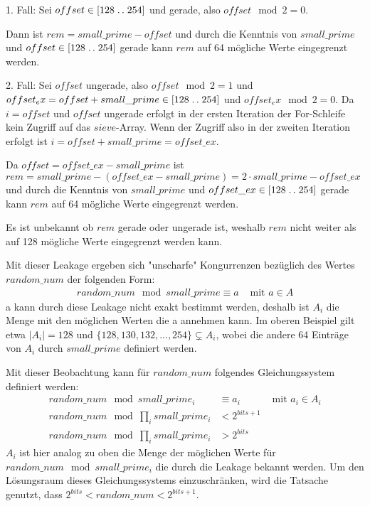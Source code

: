 1. Fall: Sei $offset \in [128\mathrel{{.}\,{.}}\nobreak254]$ und gerade, also $offset \mod 2 = 0$. 

Dann ist $rem = small\_prime - offset$ und durch die Kenntnis von $small\_prime$ und $offset \in [128\mathrel{{.}\,{.}}\nobreak254]$ gerade kann $rem$ auf 64 mögliche Werte eingegrenzt werden.

2. Fall: Sei $offset$ ungerade, also $offset \mod 2 = 1$ und $offset_ex = offset + small\_prime \in [128\mathrel{{.}\,{.}}\nobreak254]$ und $offset_ex \mod 2 = 0$. Da $i=offset$ und $offset$ ungerade erfolgt in der ersten Iteration der For-Schleife kein Zugriff auf das $sieve$-Array. Wenn der Zugriff also in der zweiten Iteration erfolgt ist $i = offset + small\_prime = offset\_ex$.

Da $offset = offset\_ex - small\_prime$ ist $rem = small\_prime - (offset\_ex - small\_prime) = 2 \cdot small\_prime - offset\_ex$ und durch die Kenntnis von $small\_prime$ und $offset\_ex \in [128\mathrel{{.}\,{.}}\nobreak254]$ gerade kann $rem$ auf 64 mögliche Werte eingegrenzt werden.

Es ist unbekannt ob $rem$ gerade oder ungerade ist, weshalb $rem$ nicht weiter als auf 128 mögliche Werte eingegrenzt werden kann.

Mit dieser Leakage ergeben sich "unscharfe" Kongurrenzen bezüglich des Wertes $random\_num$ der folgenden Form:
\begin{align}
    random\_num \mod small\_prime \equiv a &\text{ mit } a \in A
\end{align}
a kann durch diese Leakage nicht exakt bestimmt werden, deshalb ist $A_i$ die Menge mit den möglichen Werten die a annehmen kann.
Im oberen Beispiel gilt etwa $|A_i| = 128$ und $\{128,130,132,...,254\} \subsetneq A_i$, wobei die andere 64 Einträge von $A_i$ durch $small\_prime$ definiert werden.

Mit dieser Beobachtung kann für $random\_num$ folgendes Gleichungssystem definiert werden:
\begin{align*}
    random\_num \mod small\_prime_i &\equiv a_i &\text{ mit } a_i \in A_i\\
    random\_num \mod \prod_i small\_prime_i &< 2^{bits+1} \\
    random\_num \mod \prod_i small\_prime_i &> 2^{bits}
\end{align*}
$A_i$ ist hier analog zu oben die Menge der möglichen Werte für $random\_num \mod small\_prime_i$ die durch die Leakage bekannt werden.
Um den Lösungsraum dieses Gleichungssystems einzuschränken, wird die Tatsache genutzt, dass $2^{bits} < random\_num < 2^{bits+1}$.

